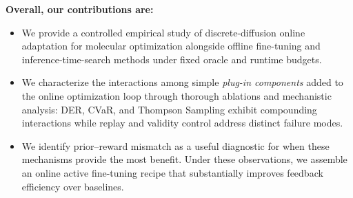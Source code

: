 \textbf{Overall, our contributions are: }
\begin{itemize}
    \item We provide a controlled empirical study of discrete-diffusion online adaptation for molecular optimization alongside offline fine-tuning and inference-time-search methods under fixed oracle and runtime budgets.

    \item We characterize the interactions among simple \emph{plug-in components} added to the online optimization loop through thorough ablations and mechanistic analysis: DER, CVaR, and Thompson Sampling exhibit compounding interactions while replay and validity control address distinct failure modes.

    \item We identify prior--reward mismatch as a useful diagnostic for when these mechanisms provide the most benefit. Under these observations, we assemble an online active fine-tuning recipe that substantially improves feedback efficiency over baselines.
    
\end{itemize}